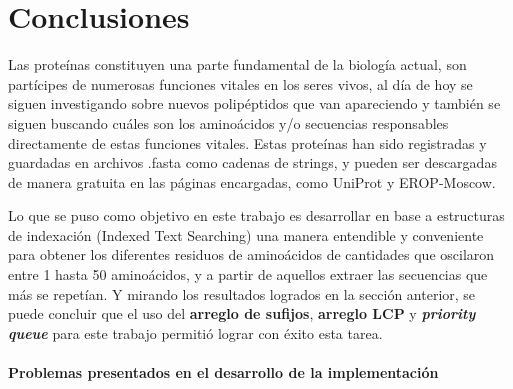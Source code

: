 \chapter*{Conclusiones}

Las proteínas constituyen una parte fundamental de la biología actual, son partícipes de numerosas funciones vitales en los seres vivos, al día de hoy se siguen investigando sobre nuevos polipéptidos que van apareciendo y también se siguen buscando cuáles son los aminoácidos y/o secuencias responsables directamente de estas funciones vitales. Estas proteínas han sido registradas y guardadas en archivos .fasta como cadenas de strings, y pueden ser descargadas de manera gratuita en las páginas encargadas, como UniProt y EROP-Moscow.

Lo que se puso como objetivo en este trabajo es desarrollar en base a estructuras de indexación (Indexed Text Searching) una manera entendible y conveniente para obtener los diferentes residuos de aminoácidos de cantidades que oscilaron entre 1 hasta 50 aminoácidos, y a partir de aquellos extraer las secuencias que más se repetían. Y mirando los resultados logrados en la sección anterior, se puede concluir que el uso del \textbf{arreglo de sufijos}, \textbf{arreglo LCP} y \textbf{\textit{priority queue}} para este trabajo permitió lograr con éxito esta tarea.

\subsubsection{Problemas presentados en el desarrollo de la implementación}

